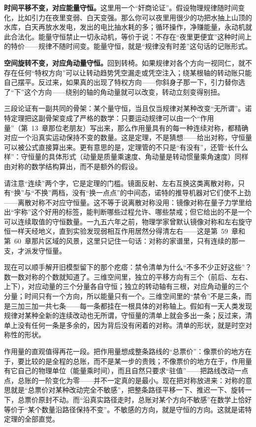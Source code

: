 \textbf{时间平移不变，对应能量守恒。}这里用一个“奸商论证”。假设物理规律随时间变化，比如引力在夜里变弱、白天变强。那么你可以夜里用很少的功把水抽上山顶的水库，白天再放水发电，发出的电比抽水耗的多；循环操作，净赚能量，永动机就此合法化。能量守恒禁止一切永动机，等价于说：不存在“夜里更便宜”这种时间上的特价——规律不随时间变。能量守恒，就是“规律没有时差”这句话的记账形式。

\textbf{空间旋转不变，对应角动量守恒。}回到转椅。如果规律对各个方向一视同仁，就不存在任何“特权方向”可以让转动趋势凭空漏走或凭空注入；绕某根轴的转动账只能自己摆平。反过来，如果真的出现了特权方向——你斜身子那一下，引力替你选了“下”这个方向——绕别的轴的角动量就可以改变，转动立刻变得别扭。

三段论证有一副共同的骨架：某个量守恒，当且仅当规律对某种改变“无所谓”。诺特定理把这副骨架变成了严格的数学：只要运动规律可以由一个“作用量”（第~13~章那位老朋友）写出来，那么作用量具有的每一种连续对称，都精确对应一个沿真实运动保持不变的数量。这是定理，不是猜想——给出对称，守恒量可以被公式直接算出来。更有意思的是，定理管的不只是“有没有”，还管“长什么样”：守恒量的具体形式（动量是质量乘速度、角动量是转动惯量乘角速度）同样由对称的数学结构算出，而不是额外的假设。

请注意“连续”两个字，它是定理的门槛。镜面反射、左右互换这类离散对称，只有“换”与“不换”两档，没有“换一点点”的中间态，诺特的推导机器对它们使不上劲——离散对称不对应守恒量。这不等于说离散对称没用：镜像对称在量子力学里给出“宇称”这个好用的标签，能判断哪些过程允许、哪些禁戒；但它给出的不是一个可以连续取值的守恒数量。一九五六年之前，物理学家曾默认镜像对称和左右旋守恒一样天经地义，直到实验发现弱相互作用居然分得清左右——这是第~59~章和第~60~章那片区域的风景，这里只记住一句话：对称的家谱里，只有连续的那一支，才派发守恒量。

现在可以顺手解开旧模型留下的那个疙瘩：禁令清单为什么“不多不少正好这些”？数一数对称的个数就知道了。三维空间里，独立的平移方向有三个（前后、左右、上下），对应动量的三个分量各自守恒；独立的转动轴有三根，对应角动量的三个分量；时间只有一个方向，所以能量只有一个。三维空间里的“禁令”不是三条，而是三加三加一共七条——每一条都挂在一根具体的对称轴上。假如有一天人类发现规律对某种全新的连续改动也无所谓，守恒量的清单上就会多出一条；反过来，清单上没有任何一条是多余的，因为背后没有闲着的对称。清单的形状，就是时空对称性的形状。

作用量的直观值得再花一段。把作用量想成整条路线的“总票价”：像票价的地方在于，要比较的是全程的总账，而不是某一步的贵贱；不像票价的地方在于，作用量有它自己的物理单位（能量乘时间），而且自然只要求“驻值”——把路线改动一点点，总账的一阶变化为零——并不一定真的是最小。现在把对称放进来：对称的意思就是“总票价对某种改动完全不敏感”，把整条路径平移一下、推迟一下、旋转一下，总票价原封不动。而“沿真实路径走时，总账对某个方向不敏感”在数学上恰好等价于“某个数量沿路径保持不变”。不敏感的方向，就是守恒的方向。这就是诺特定理的全部直觉。

